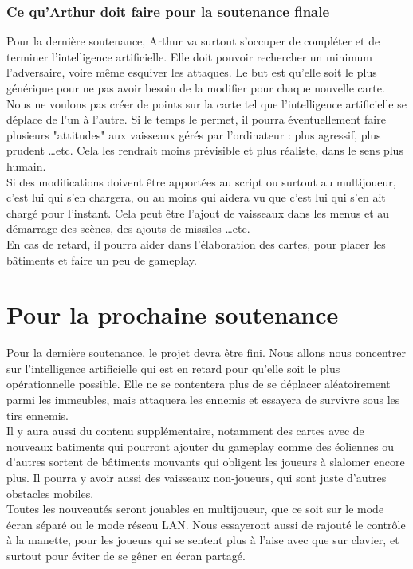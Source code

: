 \documentclass[10pt, titlepage]{report}
\begin{document}
\subsection{Ce qu'Arthur doit faire pour la soutenance finale}
Pour la dernière soutenance, Arthur va surtout s'occuper de compléter et de terminer l'intelligence artificielle. Elle doit pouvoir rechercher un minimum l'adversaire, voire même esquiver les attaques. Le but est qu'elle soit le plus générique pour ne pas avoir besoin de la modifier pour chaque nouvelle carte. Nous ne voulons pas créer de points sur la carte tel que l'intelligence artificielle se déplace de l'un à l'autre. Si le temps le permet, il pourra éventuellement faire plusieurs "attitudes" aux vaisseaux gérés par l'ordinateur : plus agressif, plus prudent \dots  etc. Cela les rendrait moins prévisible et plus réaliste, dans le sens plus humain.\\

Si des modifications doivent être apportées au script ou surtout au multijoueur, c'est lui qui s'en chargera, ou au moins qui aidera vu que c'est lui qui s'en ait chargé pour l'instant. Cela peut être l'ajout de vaisseaux dans les menus et au démarrage des scènes, des ajouts de missiles \dots etc.\\

En cas de retard, il pourra aider dans l'élaboration des cartes, pour placer les bâtiments et faire un peu de gameplay.

\chapter{Pour la prochaine soutenance}
Pour la dernière soutenance, le projet devra être fini. Nous allons nous concentrer sur l'intelligence artificielle qui est en retard pour qu'elle soit le plus opérationnelle possible. Elle ne se contentera plus de se déplacer aléatoirement parmi les immeubles, mais attaquera les ennemis et essayera de survivre sous les tirs ennemis.\\

Il y aura aussi du contenu supplémentaire, notamment des cartes avec de nouveaux batiments qui pourront ajouter du gameplay comme des éoliennes ou d'autres sortent de bâtiments mouvants qui obligent les joueurs à slalomer encore plus. Il pourra y avoir aussi des vaisseaux non-joueurs, qui sont juste d'autres obstacles mobiles.\\

Toutes les nouveautés seront jouables en multijoueur, que ce soit sur le mode écran séparé ou le mode réseau LAN. Nous essayeront aussi de rajouté le contrôle à la manette, pour les joueurs qui se sentent plus à l'aise avec que sur clavier, et surtout pour éviter de se gêner en écran partagé.\\
\end{document}
